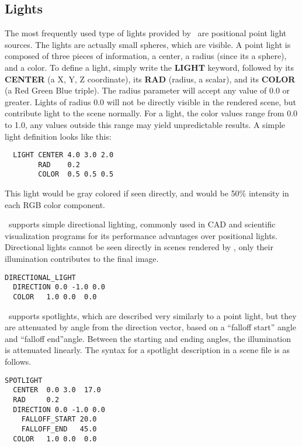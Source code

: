 
\subsection{Lights}
The most frequently used type of lights provided by \RAY\ are positional 
point light sources.  The lights are actually small spheres, which are 
visible.  A point light is composed of three pieces of
information, a center, a radius (since its a sphere), and a color.
To define a light, simply write the {\bf LIGHT} keyword, followed by 
its {\bf CENTER} (a X, Y, Z coordinate), its {\bf RAD} (radius, a scalar),
and its {\bf COLOR} (a Red Green Blue triple).  The radius parameter will
accept any value of 0.0 or greater.  Lights of radius 0.0 will not be
directly visible in the rendered scene, but contribute light to the scene
normally. 
For a light, the color values
range from 0.0 to 1.0, any values outside this range may yield unpredictable
results.  A simple light definition looks like this:
\begin{verbatim}
  LIGHT CENTER 4.0 3.0 2.0 
        RAD    0.2 
        COLOR  0.5 0.5 0.5
\end{verbatim}
This light would be gray colored if seen directly, and would be 50\% 
intensity in each RGB color component. 


\RAY\ supports simple directional lighting, commonly used in 
CAD and scientific visualization programs for its performance
advantages over positional lights.  Directional lights cannot be
seen directly in scenes rendered by \RAY, only their illumination 
contributes to the final image.  

\begin{verbatim}
DIRECTIONAL_LIGHT 
  DIRECTION 0.0 -1.0 0.0
  COLOR   1.0 0.0  0.0
\end{verbatim}

\RAY\ supports spotlights, which are described very similarly to a 
point light, but they are attenuated by angle from the direction vector,
based on a  ``falloff start'' angle and ``falloff end''angle.  Between
the starting and ending angles, the illumination is attenuated linearly.
The syntax for a spotlight description in a scene file is as follows.
\begin{verbatim}
SPOTLIGHT 
  CENTER  0.0 3.0  17.0 
  RAD     0.2
  DIRECTION 0.0 -1.0 0.0
    FALLOFF_START 20.0
    FALLOFF_END   45.0
  COLOR   1.0 0.0  0.0
\end{verbatim}

